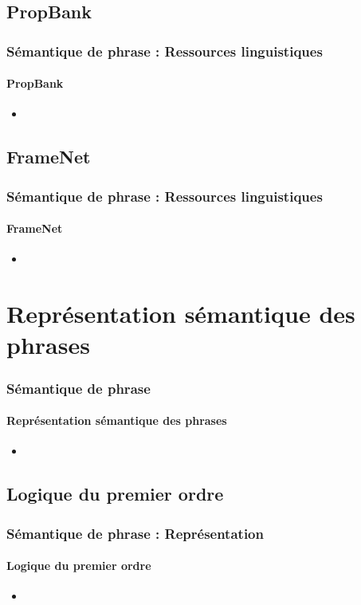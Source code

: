 \documentclass[xcolor=table]{beamer}
\begin{document}
\subsection{PropBank}

\begin{frame}
	\frametitle{Sémantique de phrase : Ressources linguistiques}
	\framesubtitle{PropBank}
	
	\begin{itemize}
		\item 
	\end{itemize}
	
\end{frame}

\subsection{FrameNet}

\begin{frame}
	\frametitle{Sémantique de phrase : Ressources linguistiques}
	\framesubtitle{FrameNet}
	
	\begin{itemize}
		\item 
	\end{itemize}
	
\end{frame}


\section{Représentation sémantique des phrases}

\begin{frame}
	\frametitle{Sémantique de phrase}
	\framesubtitle{Représentation sémantique des phrases}
	
	\begin{itemize}
		\item 
	\end{itemize}
	
\end{frame}

\subsection{Logique du premier ordre}

\begin{frame}
	\frametitle{Sémantique de phrase : Représentation}
	\framesubtitle{Logique du premier ordre}
	
	\begin{itemize}
		\item 
	\end{itemize}
	
\end{frame}
\end{document}
